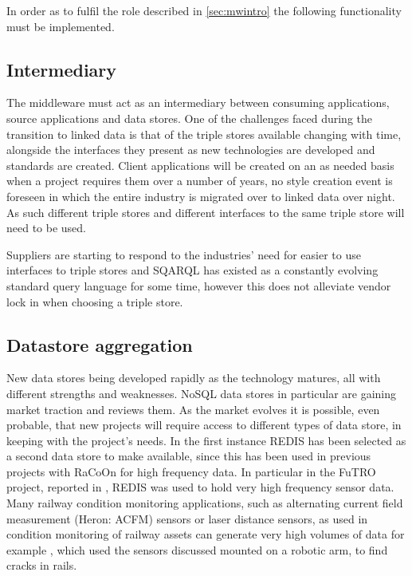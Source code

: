 In order as to fulfil the role described in \autoref{sec:mwintro} the following functionality must be implemented. 

\subsection {Intermediary}
The middleware must act as an intermediary between consuming applications, source applications and data stores. One of the challenges faced during the transition to linked data is that of the triple stores available changing with time, alongside the interfaces they present as new technologies are developed and standards are created. Client applications will be created on an as needed basis when a project requires them over a number of years, no  style creation event is foreseen in which the entire industry is migrated over to linked data over night. As such different triple stores and different interfaces to the same triple store will need to be used. 

Suppliers are starting to respond to the industries' need for easier to use interfaces to triple stores and SQARQL has existed as a constantly evolving standard query language for some time, however this does not alleviate vendor lock in when choosing a triple store. 

\subsection{Datastore aggregation}
New data stores being developed rapidly as the technology matures, all with different strengths and weaknesses. NoSQL data stores in particular are gaining market traction and \citet{Moniruzzaman2013} reviews them. As the market evolves it is possible, even probable, that new projects will require access to different types of data store, in keeping with the project's needs. In the first instance REDIS has been selected as a second data store to make available, since this has been used in previous projects with RaCoOn for high frequency data. In particular in the FuTRO project, reported in \cite{Tutcher2013}, REDIS was used to hold very high frequency sensor data. Many railway condition monitoring applications, such as alternating current field measurement (Heron: ACFM) sensors or laser distance sensors, as used in condition monitoring of railway assets can generate very high volumes of data for example \citet{Rowshandel2013}, which used the sensors discussed mounted on a robotic arm, to find cracks in rails. 

